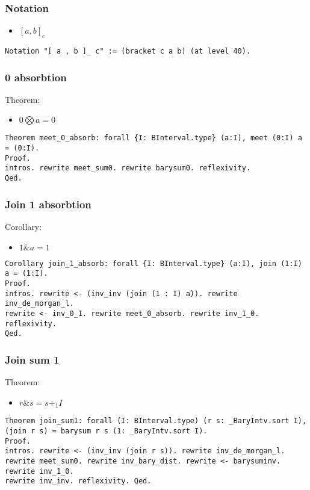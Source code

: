 \documentclass[a4paper,10pt]{article} %
\begin{document}
\subsubsection{Notation}
\begin{itemize}
    \item $[a, b]_c$
\end{itemize}
\begin{lstlisting}
Notation "[ a , b ]_ c" := (bracket c a b) (at level 40).
\end{lstlisting}

\subsubsection{0 absorbtion}
Theorem:
\begin{itemize}
    \item  $0 \bigotimes a = 0$
\end{itemize}
\begin{lstlisting}
Theorem meet_0_absorb: forall {I: BInterval.type} (a:I), meet (0:I) a = (0:I).
Proof.
intros. rewrite meet_sum0. rewrite barysum0. reflexivity.
Qed.
\end{lstlisting}

\subsubsection{Join 1 absorbtion}
Corollary:
\begin{itemize}
    \item $1 \& a = 1$
\end{itemize}
\begin{lstlisting}
Corollary join_1_absorb: forall {I: BInterval.type} (a:I), join (1:I) a = (1:I).
Proof.
intros. rewrite <- (inv_inv (join (1 : I) a)). rewrite inv_de_morgan_l. 
rewrite <- inv_0_1. rewrite meet_0_absorb. rewrite inv_1_0. reflexivity.
Qed.
\end{lstlisting}

\subsubsection{Join sum 1}
Theorem:
\begin{itemize}
    \item $r \& s = s + _1I$
\end{itemize}
\begin{lstlisting}
Theorem join_sum1: forall (I: BInterval.type) (r s: _BaryIntv.sort I), (join r s) = barysum r s (1: _BaryIntv.sort I).
Proof.
intros. rewrite <- (inv_inv (join r s)). rewrite inv_de_morgan_l. 
rewrite meet_sum0. rewrite inv_bary_dist. rewrite <- barysuminv. rewrite inv_1_0. 
rewrite inv_inv. reflexivity. Qed.
\end{lstlisting}
\end{document}
